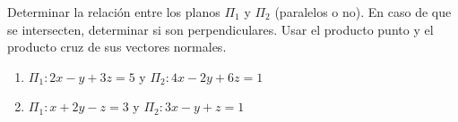 Determinar la relación entre los planos $\Pi_1$ y $\Pi_2$ (paralelos o no). En caso de que se intersecten, determinar si son perpendiculares. Usar el producto punto y el producto cruz de sus vectores normales.
\begin{enumerate}
    \item $\Pi_1: 2x - y + 3z = 5$ \quad y \quad $\Pi_2: 4x - 2y + 6z = 1$
    \item $\Pi_1: x + 2y - z = 3$ \quad y \quad $\Pi_2: 3x - y + z = 1$
\end{enumerate}